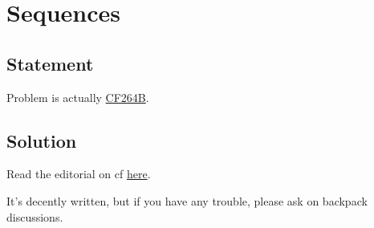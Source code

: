 \section{Sequences}
	\subsection{Statement}
		Problem is actually
		\href{http://codeforces.com/problemset/problem/264/B}{CF264B}.

	\subsection{Solution}
		Read the editorial on cf
		\href{http://codeforces.com/blog/entry/6478}{here}.

		It's decently written, but if you have any trouble, please ask
		on backpack discussions.
